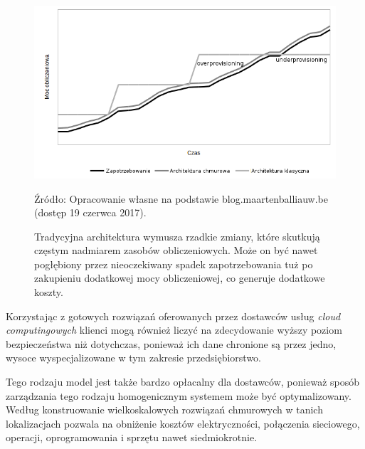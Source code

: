 \documentclass[12pt,a4paper,twoside]{article}
\newcommand{\source}[1]{\caption*{\hfill Źródło: {#1}} }
\begin{document}
\begin{figure}[h]
  \centering
\includegraphics[scale=0.9]{../obrazy/fig:overp.png}
\caption{Tradycyjna architektura wymusza rzadkie zmiany, które skutkują częstym nadmiarem zasobów obliczeniowych. Może on być nawet pogłębiony przez nieoczekiwany spadek zapotrzebowania tuż po zakupieniu dodatkowej mocy obliczeniowej, co generuje dodatkowe koszty. \label{fig:overp}}
\source{Opracowanie własne na podstawie blog.maartenballiauw.be (dostęp 19 czerwca 2017).}
\end{figure}

Korzystając z gotowych rozwiązań oferowanych przez dostawców usług \textit{cloud computingowych} klienci mogą również liczyć na zdecydowanie wyższy poziom bezpieczeństwa niż dotychczas, ponieważ ich dane chronione są przez jedno, wysoce wyspecjalizowane w tym zakresie przedsiębiorstwo.

Tego rodzaju model jest także bardzo opłacalny dla dostawców, ponieważ sposób zarządzania tego rodzaju homogenicznym systemem może być optymalizowany. Według \citet{baun2011} konstruowanie wielkoskalowych rozwiązań chmurowych w tanich lokalizacjach pozwala na obniżenie kosztów elektryczności, połączenia sieciowego, operacji, oprogramowania i sprzętu nawet siedmiokrotnie.
\end{document}
